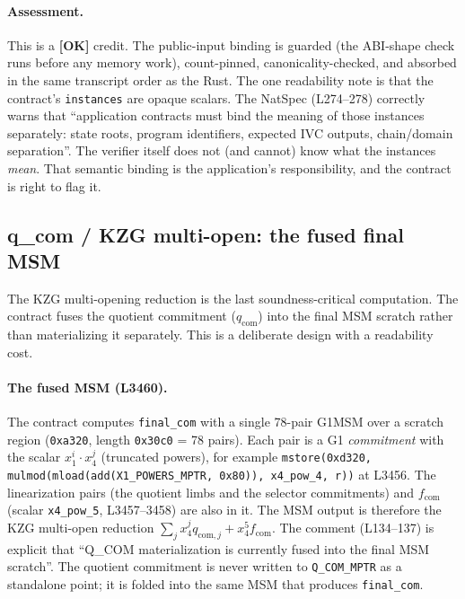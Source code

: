 \paragraph{Assessment.} This is a
\textcolor{tracegreen}{\textbf{[OK]}} credit. The public-input
binding is guarded (the ABI-shape check runs before any memory
work), count-pinned, canonicality-checked, and absorbed in the same
transcript order as the Rust. The one readability note is that the
contract's \texttt{instances} are opaque scalars. The NatSpec
(L274--278) correctly warns that ``application contracts must bind
the meaning of those instances separately: state roots, program
identifiers, expected IVC outputs, chain/domain separation''. The
verifier itself does not (and cannot) know what the instances
\emph{mean}. That semantic binding is the application's
responsibility, and the contract is right to flag it.

\subsection{q\_com / KZG multi-open: the fused final MSM}
\label{sec:pr-qcom}

The KZG multi-opening reduction is the last soundness-critical
computation. The contract fuses the quotient commitment
($q_\text{com}$) into the final MSM scratch rather than
materializing it separately. This is a deliberate design with a
readability cost.

\paragraph{The fused MSM (L3460).}
The contract computes \texttt{final\_com} with a single 78-pair
G1MSM over a scratch region (\texttt{0xa320}, length
\texttt{0x30c0} = 78 pairs). Each pair is a G1 \emph{commitment}
with the scalar $x_1^{i}\cdot x_4^{j}$ (truncated powers), for
example \texttt{mstore(0xd320, mulmod(mload(add(X1\_\allowbreak{}POWERS\_\allowbreak{}MPTR,
0x80)), x4\_\allowbreak{}pow\_\allowbreak{}4, r))} at L3456. The linearization pairs (the
quotient limbs and the selector commitments) and $f_\text{com}$
(scalar \texttt{x4\_pow\_5}, L3457--3458) are also in it. The MSM
output is therefore the KZG multi-open reduction
$\sum_j x_4^{j} q_{\text{com},j} + x_4^{5} f_\text{com}$. The
comment (L134--137) is explicit that ``Q\_COM materialization is
currently fused into the final MSM scratch''. The quotient
commitment is never written to \texttt{Q\_COM\_MPTR} as a
standalone point; it is folded into the same MSM that produces
\texttt{final\_com}.

